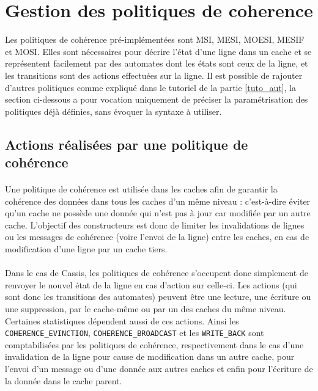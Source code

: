 \section{Gestion des politiques de coherence}

Les politiques de cohérence pré-implémentées sont MSI, MESI, MOESI, MESIF et MOSI. Elles sont nécessaires pour décrire l'état d'une ligne dans un cache et se représentent facilement par des automates dont les états sont ceux de la ligne, et les transitions sont des actions effectuées sur la ligne. Il est possible de rajouter d'autres politiques comme expliqué dans le tutoriel de la partie \ref{tuto_aut}, la section ci-dessous a pour vocation uniquement de préciser la paramétrisation des politiques déjà définies, sans évoquer la syntaxe à utiliser.

\subsection{Actions réalisées par une politique de cohérence}

\paragraph{}
Une politique de cohérence est utilisée dans les caches afin de garantir la cohérence des données dans tous les caches d'un même niveau : c'est-à-dire éviter qu'un cache ne possède une donnée qui n'est pas à jour car modifiée par un autre cache. L'objectif des constructeurs est donc de limiter les invalidations de lignes ou les messages de cohérence (voire l'envoi de la ligne) entre les caches, en cas de modification d'une ligne par un cache tiers. 

\paragraph{}
Dans le cas de \textsf{Cassis}, les politiques de cohérence s'occupent donc simplement de renvoyer le nouvel état de la ligne en cas d'action sur celle-ci. Les actions (qui sont donc les transitions des automates) peuvent être une lecture, une écriture ou une suppression, par le cache-même ou par un des caches du même niveau. Certaines statistiques dépendent aussi de ces actions. Ainsi les \verb!COHERENCE_EVINCTION!, \verb!COHERENCE_BROADCAST! et les \verb!WRITE_BACK! sont comptabilisées par les politiques de cohérence, respectivement dans le cas d'une invalidation de la ligne pour cause de modification dans un autre cache, pour l'envoi d'un message ou d'une donnée aux autres caches et enfin pour l'écriture de la donnée dans le cache parent. 


